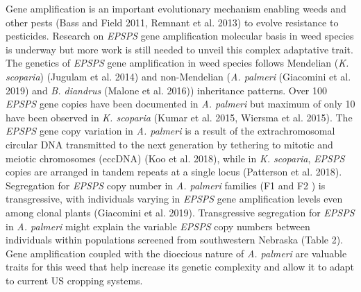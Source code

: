 \documentclass[
  12pt,
  a4paper]{article}
\begin{document}
Gene amplification is an important evolutionary mechanism enabling weeds
and other pests (Bass and Field 2011, Remnant et al. 2013) to evolve
resistance to pesticides. Research on \emph{EPSPS} gene amplification
molecular basis in weed species is underway but more work is still
needed to unveil this complex adaptative trait. The genetics of
\emph{EPSPS} gene amplification in weed species follows Mendelian
(\emph{K. scoparia}) (Jugulam et al. 2014) and non-Mendelian (\emph{A.
palmeri} (Giacomini et al. 2019) and \emph{B. diandrus} (Malone et al.
2016)) inheritance patterns. Over 100 \emph{EPSPS} gene copies have been
documented in \emph{A. palmeri} but maximum of only 10 have been
observed in \emph{K. scoparia} (Kumar et al. 2015, Wiersma et al. 2015).
The \emph{EPSPS} gene copy variation in \emph{A. palmeri} is a result of
the extrachromosomal circular DNA transmitted to the next generation by
tethering to mitotic and meiotic chromosomes (eccDNA) (Koo et al. 2018),
while in \emph{K. scoparia}, \emph{EPSPS} copies are arranged in tandem
repeats at a single locus (Patterson et al. 2018). Segregation for
\emph{EPSPS} copy number in \emph{A. palmeri} families (F\scriptsize 1
\normalsize and F\scriptsize 2 \normalsize) is transgressive, with
individuals varying in \emph{EPSPS} gene amplification levels even among
clonal plants (Giacomini et al. 2019). Transgressive segregation for
\emph{EPSPS} in \emph{A. palmeri} might explain the variable
\emph{EPSPS} copy numbers between individuals within populations
screened from southwestern Nebraska (Table 2). Gene amplification
coupled with the dioecious nature of \emph{A. palmeri} are valuable
traits for this weed that help increase its genetic complexity and allow
it to adapt to current US cropping systems.
\end{document}
